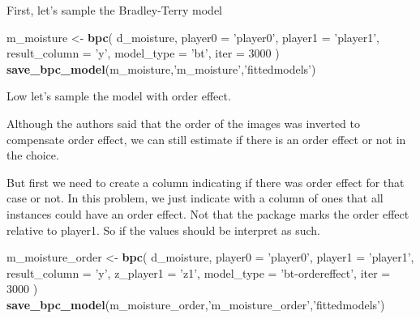 \documentclass[
]{book}
\newenvironment{Shaded}{\begin{snugshade}}{\end{snugshade}}
\newcommand{\DataTypeTok}[1]{\textcolor[rgb]{0.13,0.29,0.53}{#1}}
\newcommand{\DecValTok}[1]{\textcolor[rgb]{0.00,0.00,0.81}{#1}}
\newcommand{\KeywordTok}[1]{\textcolor[rgb]{0.13,0.29,0.53}{\textbf{#1}}}
\newcommand{\NormalTok}[1]{#1}
\newcommand{\OperatorTok}[1]{\textcolor[rgb]{0.81,0.36,0.00}{\textbf{#1}}}
\newcommand{\StringTok}[1]{\textcolor[rgb]{0.31,0.60,0.02}{#1}}
\begin{document}
First, let's sample the Bradley-Terry model

\begin{Shaded}
\begin{Highlighting}[]
\NormalTok{m_moisture <-}
\StringTok{  }\KeywordTok{bpc}\NormalTok{(}
\NormalTok{    d_moisture,}
    \DataTypeTok{player0 =} \StringTok{'player0'}\NormalTok{,}
    \DataTypeTok{player1 =} \StringTok{'player1'}\NormalTok{,}
    \DataTypeTok{result_column =} \StringTok{'y'}\NormalTok{,}
    \DataTypeTok{model_type =} \StringTok{'bt'}\NormalTok{,}
    \DataTypeTok{iter =} \DecValTok{3000}
\NormalTok{  )}
\KeywordTok{save_bpc_model}\NormalTok{(m_moisture,}\StringTok{'m_moisture'}\NormalTok{,}\StringTok{'fittedmodels'}\NormalTok{)}
\end{Highlighting}
\end{Shaded}

Low let's sample the model with order effect.

Although the authors said that the order of the images was inverted to compensate order effect, we can still estimate if there is an order effect or not in the choice.

But first we need to create a column indicating if there was order effect for that case or not. In this problem, we just indicate with a column of ones that all instances could have an order effect. Not that the package marks the order effect relative to player1. So if the values should be interpret as such.

\begin{Shaded}
\end{Shaded}

\begin{Shaded}
\begin{Highlighting}[]
\NormalTok{m_moisture_order <-}
\StringTok{  }\KeywordTok{bpc}\NormalTok{(}
\NormalTok{    d_moisture,}
    \DataTypeTok{player0 =} \StringTok{'player0'}\NormalTok{,}
    \DataTypeTok{player1 =} \StringTok{'player1'}\NormalTok{,}
    \DataTypeTok{result_column =} \StringTok{'y'}\NormalTok{,}
    \DataTypeTok{z_player1 =} \StringTok{'z1'}\NormalTok{,}
    \DataTypeTok{model_type =} \StringTok{'bt-ordereffect'}\NormalTok{,}
    \DataTypeTok{iter =} \DecValTok{3000}
\NormalTok{  )}
\KeywordTok{save_bpc_model}\NormalTok{(m_moisture_order,}\StringTok{'m_moisture_order'}\NormalTok{,}\StringTok{'fittedmodels'}\NormalTok{)}
\end{Highlighting}
\end{Shaded}
\end{document}
